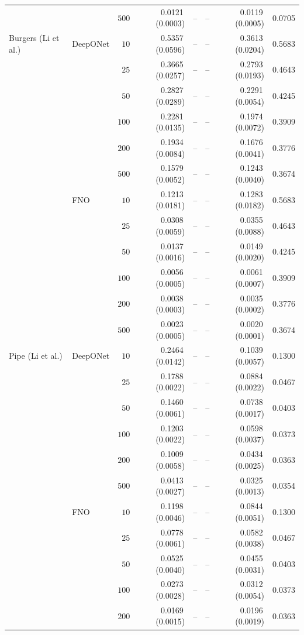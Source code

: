 \documentclass{article}
\begin{document}
{\begin{longtable}{llrrrrrr}
 &  & $500$ & 0.0121\,(0.0003) & -- & -- & 0.0119\,(0.0005) & 0.0705\\
Burgers (Li et al.) & DeepONet & $10$ & 0.5357\,(0.0596) & -- & -- & 0.3613\,(0.0204) & 0.5683\\
 &  & $25$ & 0.3665\,(0.0257) & -- & -- & 0.2793\,(0.0193) & 0.4643\\
 &  & $50$ & 0.2827\,(0.0289) & -- & -- & 0.2291\,(0.0054) & 0.4245\\
 &  & $100$ & 0.2281\,(0.0135) & -- & -- & 0.1974\,(0.0072) & 0.3909\\
 &  & $200$ & 0.1934\,(0.0084) & -- & -- & 0.1676\,(0.0041) & 0.3776\\
 &  & $500$ & 0.1579\,(0.0052) & -- & -- & 0.1243\,(0.0040) & 0.3674\\
 & FNO & $10$ & 0.1213\,(0.0181) & -- & -- & 0.1283\,(0.0182) & 0.5683\\
 &  & $25$ & 0.0308\,(0.0059) & -- & -- & 0.0355\,(0.0088) & 0.4643\\
 &  & $50$ & 0.0137\,(0.0016) & -- & -- & 0.0149\,(0.0020) & 0.4245\\
 &  & $100$ & 0.0056\,(0.0005) & -- & -- & 0.0061\,(0.0007) & 0.3909\\
 &  & $200$ & 0.0038\,(0.0003) & -- & -- & 0.0035\,(0.0002) & 0.3776\\
 &  & $500$ & 0.0023\,(0.0005) & -- & -- & 0.0020\,(0.0001) & 0.3674\\
Pipe (Li et al.) & DeepONet & $10$ & 0.2464\,(0.0142) & -- & -- & 0.1039\,(0.0057) & 0.1300\\
 &  & $25$ & 0.1788\,(0.0022) & -- & -- & 0.0884\,(0.0022) & 0.0467\\
 &  & $50$ & 0.1460\,(0.0061) & -- & -- & 0.0738\,(0.0017) & 0.0403\\
 &  & $100$ & 0.1203\,(0.0022) & -- & -- & 0.0598\,(0.0037) & 0.0373\\
 &  & $200$ & 0.1009\,(0.0058) & -- & -- & 0.0434\,(0.0025) & 0.0363\\
 &  & $500$ & 0.0413\,(0.0027) & -- & -- & 0.0325\,(0.0013) & 0.0354\\
 & FNO & $10$ & 0.1198\,(0.0046) & -- & -- & 0.0844\,(0.0051) & 0.1300\\
 &  & $25$ & 0.0778\,(0.0061) & -- & -- & 0.0582\,(0.0038) & 0.0467\\
 &  & $50$ & 0.0525\,(0.0040) & -- & -- & 0.0455\,(0.0031) & 0.0403\\
 &  & $100$ & 0.0273\,(0.0028) & -- & -- & 0.0312\,(0.0054) & 0.0373\\
 &  & $200$ & 0.0169\,(0.0015) & -- & -- & 0.0196\,(0.0019) & 0.0363\\

\end{longtable}}
\end{document}
